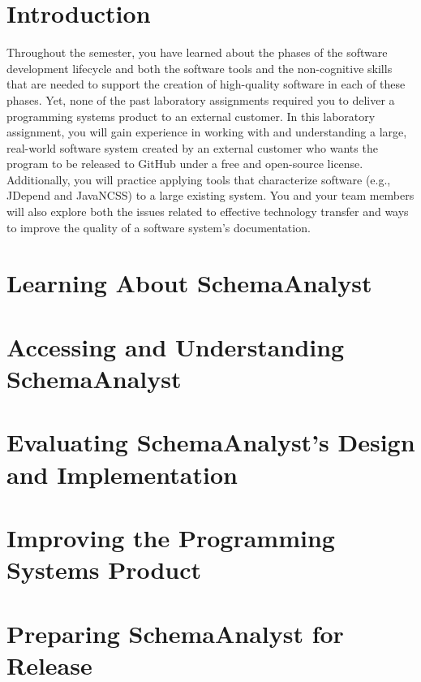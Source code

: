 

\usepackage[compact]{titlesec}



\section*{Introduction}

Throughout the semester, you have learned about the phases of the software development lifecycle and both the software
tools and the non-cognitive skills that are needed to support the creation of high-quality software in each of these
phases. Yet, none of the past laboratory assignments required you to deliver a programming systems product to an
external customer. In this laboratory assignment, you will gain experience in working with and understanding a large,
real-world software system created by an external customer who wants the program to be released to GitHub under a free
and open-source license. Additionally, you will practice applying tools that characterize software (e.g., JDepend and
JavaNCSS) to a large existing system. You and your team members will also explore both the issues related to effective
technology transfer and ways to improve the quality of a software system's documentation.

\section*{Learning About SchemaAnalyst}

\section*{Accessing and Understanding SchemaAnalyst}

\section*{Evaluating SchemaAnalyst's Design and Implementation}

\section*{Improving the Programming Systems Product}

\section*{Preparing SchemaAnalyst for Release}

